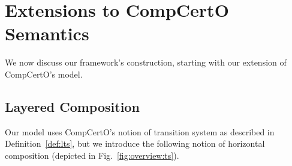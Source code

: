\documentclass[acmsmall,screen,review,anonymous]{acmart}
\newcommand{\kw}[1]{\ensuremath{ \mathsf{#1} }}
\begin{document}
%


\section{Extensions to CompCertO Semantics} \label{sec:base} %

We now discuss our framework's construction,
starting with our extension of CompCertO's model.

\subsection{Layered Composition} \label{sec:base:ts} %

Our model uses CompCertO's notion of transition system
as described in Definition~\ref{def:lts},
but we introduce the following notion of horizontal composition
(depicted in Fig.~\ref{fig:overview:ts}).
\end{document}
